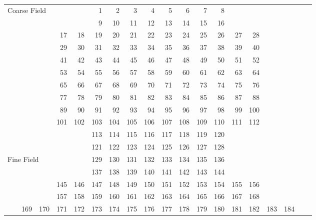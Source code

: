 \pagestyle{myheadings}


\setlength{\textwidth}{240mm}
\setlength{\textheight}{160mm}
\setlength{\topmargin}{-25mm}
\setlength{\oddsidemargin}{0mm}
\setlength{\evensidemargin}{0mm}
\setlength{\parindent}{0mm}
\setlength{\parskip}{\medskipamount}
\setlength{\unitlength}{1mm}


\thispagestyle{empty}

\begin{figure} 
\begin{center} {\small
 \begin{tabular}{*{20}{r}} 
\multicolumn{6}{l}{Coarse Field} & 1 & 2 & 3 & 4 & 5 & 6 & 7 & 8 \\
&&&&&& 9 & 10 & 11 & 12 & 13 & 14 & 15 & 16 \\
&&&& 17 & 18 & 19 & 20 & 21 & 22 & 23 & 24 & 25 & 26 & 27 & 28 \\
&&&& 29 & 30 & 31 & 32 & 33 & 34 & 35 & 36 & 37 & 38 & 39 & 40 \\
&&&& 41 & 42 & 43 & 44 & 45 & 46 & 47 & 48 & 49 & 50 & 51 & 52 \\
&&&& 53 & 54 & 55 & 56 & 57 & 58 & 59 & 60 & 61 & 62 & 63 & 64 \\
&&&& 65 & 66 & 67 & 68 & 69 & 70 & 71 & 72 & 73 & 74 & 75 & 76 \\
&&&& 77 & 78 & 79 & 80 & 81 & 82 & 83 & 84 & 85 & 86 & 87 & 88 \\
&&&& 89 & 90 & 91 & 92 & 93 & 94 & 95 & 96 & 97 & 98 & 99 & 100 \\
&&&& 101 & 102 & 103 & 104 & 105 & 106 & 107 & 108 & 109 & 110 & 111 & 112 \\
&&&&&& 113 & 114 & 115 & 116 & 117 & 118 & 119 & 120 \\
&&&&&& 121 & 122 & 123 & 124 & 125 & 126 & 127 & 128 \\ \hline
\multicolumn{6}{l}{Fine Field} & 129 & 130 & 131 & 132 & 133 & 134 & 135 & 136 
\\
&&&&&& 137 & 138 & 139 & 140 & 141 & 142 & 143 & 144 \\
&&&& 145 & 146 & 147 & 148 & 149 & 150 & 151 & 152 & 153 & 154 & 155 & 156 \\
&&&& 157 & 158 & 159 & 160 & 161 & 162 & 163 & 164 & 165 & 166 & 167 & 168 \\
&& 169 & 170 & 171 & 172 & 173 & 174 & 175 & 176 & 177 & 178 & 179 & 180 & 181
& 182 & 183 & 184 \\

\end{tabular}}
\end{center}
\end{figure}

